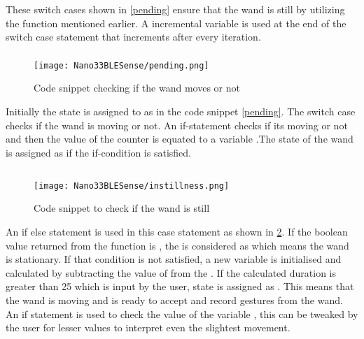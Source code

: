 These switch cases shown in \ref{pending} ensure that the wand is still by utilizing the function  mentioned earlier. A incremental variable  is used at the end of the switch case statement that increments after every iteration. 

\subsubsection{}

\begin{figure}[h!]
    \texttt{[image: Nano33BLESense/pending.png]}
    \caption{Code snippet checking if the wand moves or not}
    \label{instillness}
\end{figure}

Initially the state is assigned to as  in the code snippet \ref{pending}. The switch case checks if the wand is moving or not. An if-statement checks if its moving or not and then the value of the counter is equated to a variable .The state of the wand is assigned as  if the if-condition is satisfied.

\subsection{} 

\begin{figure}[h!]
    \texttt{[image: Nano33BLESense/instillness.png]}
    \caption{Code snippet to check if the wand is still}
    \label{instillness}
\end{figure}

An if else statement is used in this case statement as shown in \ref{instillness}. If the boolean value returned from the function   is  , the  is considered as  which means the wand is stationary. If that condition is not satisfied, a new variable  is initialised and calculated by subtracting  the value of  from the .
If the calculated duration is greater than 25  which is input by the user, state is assigned as . This means that the wand is moving and is ready to accept and record gestures from the wand. 
An if statement is used to check the value of the variable , this can be tweaked by the user for lesser values to interpret even the slightest movement. 

